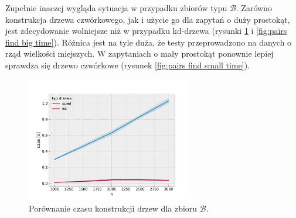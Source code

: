 \documentclass[12pt]{scrartcl}
\newcommand{\sB}{\mathcal B}
\begin{document}
Zupełnie inaczej wygląda sytuacja w przypadku zbiorów typu $\sB$. Zarówno konstrukcja drzewa czwórkowego, jak i użycie go dla zapytań o duży prostokąt, jest zdecydowanie wolniejsze niż w przypadku kd-drzewa (rysunki \ref{fig:pairs construction time} i \ref{fig:pairs find big time}). Różnica jest na tyle duża, że testy przeprowadzono na danych o rząd wielkości miejszych. W zapytaniach o mały prostokąt ponownie lepiej sprawdza się drzewo czwórkowe (rysunek \ref{fig:pairs find small time}).

\begin{figure}[H]
    \centering
    \includegraphics[width=0.65\textwidth]{imgs/pairs_construction_time}
    \caption{Porównanie czasu konstrukcji drzew dla zbioru $\sB$.}
    \label{fig:pairs construction time}
\end{figure}
\end{document}
